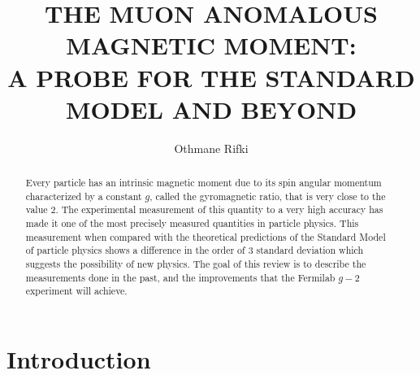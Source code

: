 \documentclass{outhesis}
\begin{document}
\author{Othmane Rifki}
\title{THE MUON ANOMALOUS MAGNETIC MOMENT:\\ A PROBE FOR THE STANDARD MODEL AND BEYOND}
\address{Norman, Oklahoma}


%  


\begin{abstract}
Every particle has an intrinsic magnetic moment due to its spin angular momentum characterized by a constant $g$, called the gyromagnetic ratio, that is very close to the value 2. The experimental measurement of this quantity to a very high accuracy has made it one of the most precisely measured quantities in particle physics. This measurement when compared with the theoretical predictions of the Standard Model of particle physics shows a difference in the order of 3 standard deviation which suggests the possibility of new physics. The goal of this review is to describe the measurements done in the past, and the improvements that the Fermilab $g-2$ experiment will achieve.

\end{abstract}


\frontmatter

\maketitle

\mainmatter



\section{Introduction}
\label{sec:intro}
\end{document}
